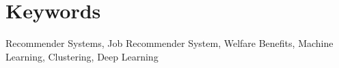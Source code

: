 \documentclass[10pt, sigconf, format=acmsmall, screen=true, review=false]{acmart}
\begin{document}
\section*{Keywords}
Recommender Systems, Job Recommender System, Welfare Benefits, Machine Learning, Clustering, Deep Learning














\pagebreak
\onecolumn
\appendix




%
 
\end{document}
